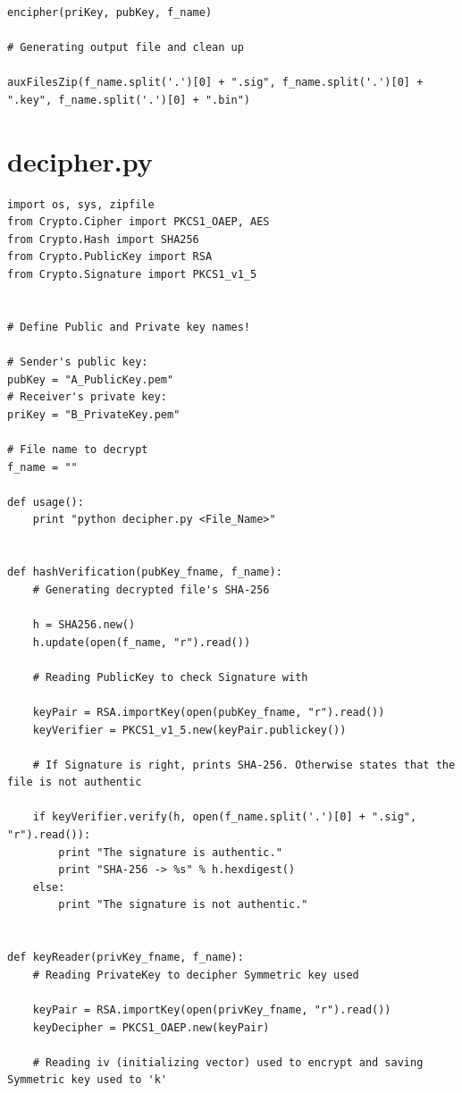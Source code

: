 \documentclass[a4paper,11pt,openright,oneside]{report}
\begin{document}
\begin{appendices}
\begin{verbatim}
encipher(priKey, pubKey, f_name)

# Generating output file and clean up

auxFilesZip(f_name.split('.')[0] + ".sig", f_name.split('.')[0] + ".key", f_name.split('.')[0] + ".bin")
\end{verbatim}

\newpage
\section{decipher.py}
\label{decipher.py}

\begin{verbatim}
import os, sys, zipfile
from Crypto.Cipher import PKCS1_OAEP, AES
from Crypto.Hash import SHA256
from Crypto.PublicKey import RSA
from Crypto.Signature import PKCS1_v1_5


# Define Public and Private key names!

# Sender's public key:
pubKey = "A_PublicKey.pem"
# Receiver's private key:
priKey = "B_PrivateKey.pem"

# File name to decrypt
f_name = ""

def usage():
    print "python decipher.py <File_Name>"


def hashVerification(pubKey_fname, f_name):
    # Generating decrypted file's SHA-256

    h = SHA256.new()
    h.update(open(f_name, "r").read())

    # Reading PublicKey to check Signature with

    keyPair = RSA.importKey(open(pubKey_fname, "r").read())
    keyVerifier = PKCS1_v1_5.new(keyPair.publickey())

    # If Signature is right, prints SHA-256. Otherwise states that the file is not authentic

    if keyVerifier.verify(h, open(f_name.split('.')[0] + ".sig", "r").read()):
        print "The signature is authentic."
        print "SHA-256 -> %s" % h.hexdigest()
    else:
        print "The signature is not authentic."


def keyReader(privKey_fname, f_name):
    # Reading PrivateKey to decipher Symmetric key used

    keyPair = RSA.importKey(open(privKey_fname, "r").read())
    keyDecipher = PKCS1_OAEP.new(keyPair)

    # Reading iv (initializing vector) used to encrypt and saving Symmetric key used to 'k'


\end{verbatim}
\end{appendices}
\end{document}
